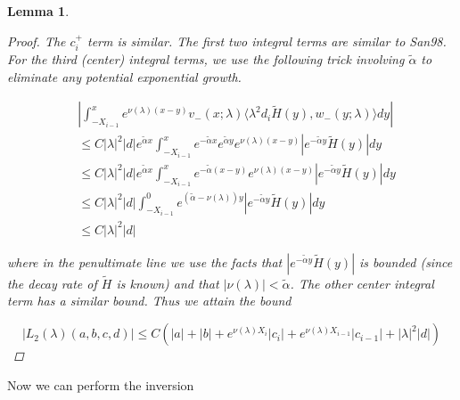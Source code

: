 \documentclass[12pt]{article}
\newtheorem{lemma}{Lemma}
\begin{document}
\begin{lemma}
\begin{proof}
The $c_i^+$ term is similar. The first two integral terms are similar to San98. For the third (center) integral terms, we use the following trick involving $\tilde{\alpha}$ to eliminate any potential exponential growth.

\begin{align*}
&\left| \int_{-X_{i-1}}^x 
e^{\nu(\lambda)(x-y)} v_-(x; \lambda) \langle \lambda^2 d_i \tilde{H}(y), w_-(y; \lambda) \rangle dy \right| \\
&\leq C |\lambda|^2 |d| e^{\tilde{\alpha}x} \int_{-X_{i-1}}^x e^{-\tilde{\alpha}x} e^{\tilde{\alpha}y} e^{\nu(\lambda)(x-y)} |e^{-\tilde{\alpha}y}\tilde{H}(y)|dy \\
&\leq C |\lambda|^2 |d| e^{\tilde{\alpha}x} \int_{-X_{i-1}}^x e^{-\tilde{\alpha}(x-y)} e^{\nu(\lambda)(x-y)} |e^{-\tilde{\alpha}y}\tilde{H}(y)|dy \\
&\leq C |\lambda|^2 |d| \int_{-X_{i-1}}^0 e^{(\tilde{\alpha}-\nu(\lambda))y} |e^{-\tilde{\alpha}y}\tilde{H}(y)|dy \\
&\leq C |\lambda|^2 |d|
\end{align*}

where in the penultimate line we use the facts that $|e^{-\tilde{\alpha}y}\tilde{H}(y)|$ is bounded (since the decay rate of $\tilde{H}$ is known) and that $|\nu(\lambda)| < \tilde{\alpha}$. The other center integral term has a similar bound. Thus we attain the bound 

\[
|L_2(\lambda)(a,b,c,d)| \leq C (|a| + |b| + e^{\nu(\lambda)X_i}|c_i| + e^{\nu(\lambda)X_{i-1}}|c_{i-1}| + |\lambda|^2 |d| )
\]

\end{proof}
\end{lemma}

Now we can perform the inversion

\end{document}

